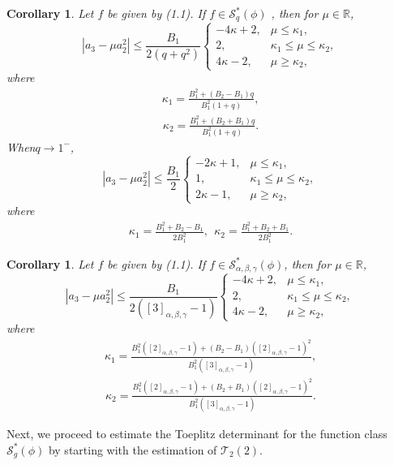 \documentclass[11pt,twoside, reqno]{article}
\newtheorem{corollary}[theorem]{Corollary}
\theoremstyle{definition}
\begin{document}
\begin{corollary}
Let $f$ be given by (1.1). If $f\in\mathcal{S}^{\ast }_{q}(\phi)$ , then for $\mu \in \mathbb{R}$,
\begin{equation*}
\left|a_{3} - \mu a_{2}^{2}\right| \leq \frac{B_{1}}{2(q+q^{2})}
\begin{cases}
-4\kappa + 2, & \mu \leq \kappa_{1}, \\
2, &  \kappa_{1} \leq \mu \leq \kappa_{2}, \\
4\kappa - 2, &  \mu \geq \kappa_{2},
\end{cases}
\end{equation*}
where
\begin{align}\nonumber
\kappa_{1}=\frac{B_{1}^{2}+(B_{2}-B_{1})q}{B_{1}^{2}(1+q)},
\end{align}
\begin{align}\nonumber
\kappa_{2}=\frac{B_{1}^{2}+(B_{2}+B_{1})q}{B_{1}^{2}(1+q)}.
\end{align}
When$q\rightarrow1^{-}$,
\begin{equation*}
\left|a_{3} - \mu a_{2}^{2}\right| \leq \frac{B_{1}}{2}
\begin{cases}
-2\kappa + 1, & \mu \leq \kappa_{1}, \\
1, &  \kappa_{1} \leq \mu \leq \kappa_{2}, \\
2\kappa - 1, &  \mu \geq \kappa_{2},
\end{cases}
\end{equation*}
where
\begin{align}\nonumber
\kappa_{1}=\frac{B_{1}^{2}+B_{2}-B_{1}}{2B_{1}^{2}},\ \
\kappa_{2}=\frac{B_{1}^{2}+B_{2}+B_{1}}{2B_{1}^{2}}.
\end{align}
\end{corollary}

\begin{corollary}
Let $f$ be given by (1.1). If $f\in\mathcal{S}^{\ast }_{\alpha, \beta, \gamma}(\phi)$, then for $\mu \in \mathbb{R}$,
\begin{equation*}
\left|a_{3} - \mu a_{2}^{2}\right| \leq \frac{B_{1}}{2([3]_{\alpha, \beta, \gamma}-1)}
\begin{cases}
-4\kappa + 2, & \mu \leq \kappa_{1}, \\
2, &  \kappa_{1} \leq \mu \leq \kappa_{2}, \\
4\kappa - 2, &  \mu \geq \kappa_{2},
\end{cases}
\end{equation*}
where
\begin{align}\nonumber
\kappa_{1}=\frac{B_{1}^{2}([2]_{\alpha, \beta, \gamma}-1)+(B_{2}-B_{1})([2]_{\alpha, \beta, \gamma}-1)^{2}}{B_{1}^{2}([3]_{\alpha, \beta, \gamma}-1)},
\end{align}
\begin{align}\nonumber
\kappa_{2}=\frac{B_{1}^{2}([2]_{\alpha, \beta, \gamma}-1)+(B_{2}+B_{1})([2]_{\alpha, \beta, \gamma}-1)^{2}}{B_{1}^{2}([3]_{\alpha, \beta, \gamma}-1)}.
\end{align}
\end{corollary}
Next, we proceed to estimate the Toeplitz determinant for the function class $\mathcal{S}^{\ast }_{g}(\phi)$ by starting with the estimation of $\mathcal{T}_2(2)$.
\end{document}
